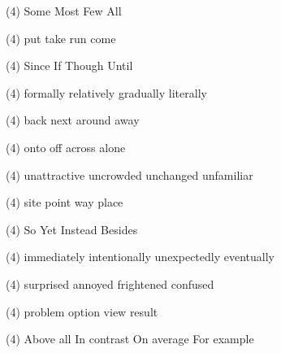\item
\begin{tasks}(4)
	\task Some
	\task Most
	\task Few
	\task All
\end{tasks}
\item
\begin{tasks}(4)
	\task put
	\task take
	\task run
	\task come
\end{tasks}
\item
\begin{tasks}(4)
	\task Since
	\task If
	\task Though
	\task Until
\end{tasks}
\item
\begin{tasks}(4)
	\task formally
	\task relatively
	\task gradually
	\task literally
\end{tasks}
\item
\begin{tasks}(4)
	\task back
	\task next
	\task around
	\task away
\end{tasks}
\item
\begin{tasks}(4)
	\task onto
	\task off
	\task across
	\task alone
\end{tasks}
\item
\begin{tasks}(4)
	\task unattractive
	\task uncrowded
	\task unchanged
	\task unfamiliar
\end{tasks}
\item
\begin{tasks}(4)
	\task site
	\task point
	\task way
	\task place
\end{tasks}
\item
\begin{tasks}(4)
	\task So
	\task Yet
	\task Instead
	\task Besides
\end{tasks}
\item
\begin{tasks}(4)
	\task immediately
	\task intentionally
	\task unexpectedly
	\task eventually
\end{tasks}
\item
\begin{tasks}(4)
	\task surprised
	\task annoyed
	\task frightened
	\task confused
\end{tasks}
\item
\begin{tasks}(4)
	\task problem
	\task option
	\task view
	\task result
\end{tasks}
\item
\begin{tasks}(4)
	\task Above all
	\task In contrast
	\task On average
	\task For example
\end{tasks}
